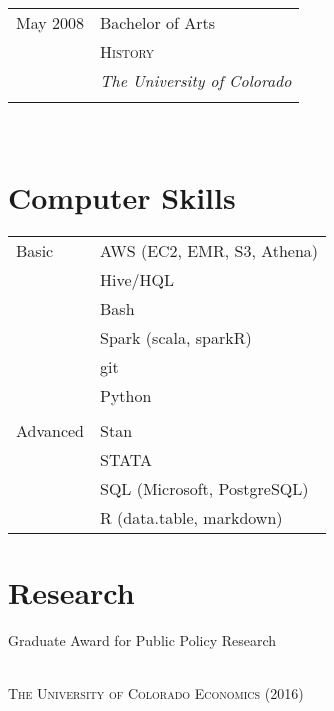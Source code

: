 \documentclass[10pt]{article} %
\begin{document}
\begin{minipage}[t]{0.46\textwidth}
\begin{tabular}{p{2cm} | p{6cm}}
May 2008 & {\Large Bachelor of Arts}  \\ 
& \textsc{History}\\
& \textit{The University of Colorado}\\
&\\
   
\end{tabular}\\


\section{Computer Skills} 


\large {\begin{tabular}{p{2cm} | p{6cm}}
\\
Basic 
& AWS (EC2, EMR, S3, Athena) \\
& Hive/HQL\\
& Bash\\
& Spark (scala, sparkR)\\
& git \\
& Python \\
& \\
Advanced
& Stan \\ 
& STATA \\
& SQL (Microsoft, PostgreSQL)\\
& R (data.table, markdown)\\
\end{tabular} } 





\section{Research} 

\vspace{3mm}

{\raggedright\large Graduate Award for Public Policy Research } \\
{\normalsize \textsc{The University of Colorado Economics (2016)}\\}


\end{minipage}
\end{document}
